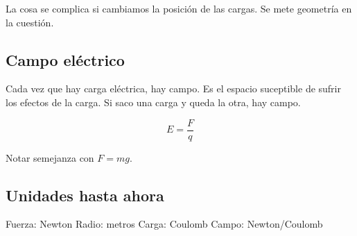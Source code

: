 La cosa se complica si cambiamos la posición de las cargas.
Se mete geometría en la cuestión.

\subsection{Campo eléctrico}

Cada vez que hay carga eléctrica, hay campo.
Es el espacio suceptible de sufrir los efectos de la carga.
Si saco una carga y queda la otra,
hay campo.

\begin{equation}
    E = \frac{F}{q}
\end{equation}

Notar semejanza con \(F=mg\).

\subsection{Unidades hasta ahora}

Fuerza: Newton
Radio: metros
Carga: Coulomb
Campo: Newton/Coulomb

